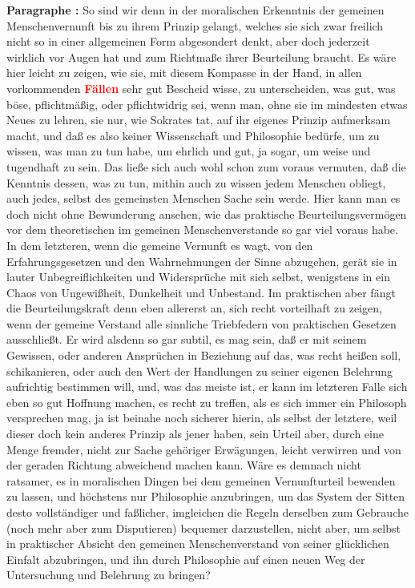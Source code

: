 \documentclass[a4paper,12pt,twoside]{book}
\newcommand{\match}[1]{\textcolor{red}{\textbf{#1}}}
\begin{document}
	\textbf{Paragraphe : }So sind wir denn in der moralischen Erkenntnis der gemeinen Menschenvernunft bis zu ihrem Prinzip gelangt, welches sie sich zwar freilich nicht so in einer allgemeinen  Form abgesondert denkt, aber doch jederzeit wirklich vor Augen hat und zum Richtmaße ihrer Beurteilung braucht. Es wäre hier leicht zu zeigen, wie sie, mit diesem Kompasse in der Hand, in allen vorkommenden \match{Fällen} sehr gut Bescheid wisse, zu unterscheiden, was gut, was böse, pflichtmäßig, oder pflichtwidrig sei, wenn man, ohne sie im mindesten etwas Neues zu lehren, sie nur, wie Sokrates tat, auf ihr eigenes Prinzip aufmerksam macht, und daß es also keiner Wissenschaft und Philosophie bedürfe, um zu wissen, was man zu tun habe, um ehrlich und gut, ja sogar, um weise und tugendhaft zu sein. Das ließe sich auch wohl schon zum voraus vermuten, daß die Kenntnis dessen, was zu tun, mithin auch zu wissen jedem Menschen obliegt, auch jedes, selbst des gemeinsten Menschen Sache sein werde. Hier kann man es doch nicht ohne Bewunderung ansehen, wie das praktische Beurteilungsvermögen vor dem theoretischen im gemeinen Menschenverstande so gar viel voraus habe. In dem letzteren, wenn die gemeine Vernunft es wagt, von den Erfahrungsgesetzen und den Wahrnehmungen der Sinne abzugehen, gerät sie in lauter Unbegreiflichkeiten und Widersprüche mit sich selbst, wenigstens in ein Chaos von Ungewißheit, Dunkelheit und Unbestand. Im praktischen aber fängt die Beurteilungskraft denn eben allererst an, sich recht vorteilhaft zu zeigen, wenn der gemeine Verstand alle sinnliche Triebfedern von praktischen Gesetzen ausschließt. Er wird alsdenn so gar subtil, es mag sein, daß er mit seinem Gewissen, oder anderen Ansprüchen in Beziehung auf das, was recht heißen soll, schikanieren, oder auch den Wert der Handlungen zu seiner eigenen Belehrung aufrichtig bestimmen will, und, was das meiste ist, er kann im letzteren Falle sich eben so gut Hoffnung machen, es recht zu treffen, als es sich immer ein Philosoph versprechen mag, ja ist beinahe noch sicherer hierin, als selbst der letztere, weil dieser doch kein anderes Prinzip als jener haben, sein Urteil aber, durch eine Menge fremder, nicht zur Sache gehöriger Erwägungen, leicht verwirren und von der geraden Richtung abweichend machen kann. Wäre es demnach nicht ratsamer,  es in moralischen Dingen bei dem gemeinen Vernunfturteil bewenden zu lassen, und höchstens nur Philosophie anzubringen, um das System der Sitten desto vollständiger und faßlicher, imgleichen die Regeln derselben zum Gebrauche (noch mehr aber zum Disputieren) bequemer darzustellen, nicht aber, um selbst in praktischer Absicht den gemeinen Menschenverstand von seiner glücklichen Einfalt abzubringen, und ihn durch Philosophie auf einen neuen Weg der Untersuchung und Belehrung zu bringen? 
	
\end{document}
